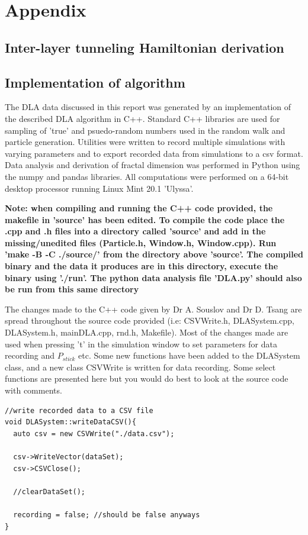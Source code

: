 \documentclass[10pt, twocolumn]{article} %
\begin{document}



\clearpage

\onecolumn

\section*{Appendix}

\subsection*{Inter-layer tunneling Hamiltonian derivation}

\subsection*{Implementation of algorithm}
  The DLA data discussed in this report was generated by an implementation of the described DLA algorithm in C++. Standard C++ libraries are used for sampling of 'true' and psuedo-random numbers used in the random walk and particle generation. Utilities were written to record multiple simulations with varying parameters and to export recorded data from simulations to a csv format. Data analysis and derivation of fractal dimension was performed in Python using the numpy and pandas libraries. All computations were performed on a 64-bit desktop processor running Linux Mint 20.1 'Ulyssa'.

  \textbf{Note: when compiling and running the C++ code provided, the makefile in 'source' has been edited. To compile the code place the .cpp and .h files into a directory called 'source' and add in the missing/unedited files (Particle.h, Window.h, Window.cpp). Run 'make -B -C ./source/' from the directory above 'source'. The compiled binary and the data it produces are in this directory, execute the binary using './run'. The python data analysis file 'DLA.py' should also be run from this same directory}

  The changes made to the C++ code given by Dr A. Souslov and Dr D. Tsang are spread throughout the source code provided (i.e: CSVWrite.h, DLASystem.cpp, DLASystem.h, mainDLA.cpp, rnd.h, Makefile). Most of the changes made are used when pressing 't' in the simulation window to set parameters for data recording and $P_{stick}$ etc. Some new functions have been added to the DLASystem class, and a new class CSVWrite is written for data recording. Some select functions are presented here but you would do best to look at the source code with comments.

\begin{lstlisting}
//write recorded data to a CSV file
void DLASystem::writeDataCSV(){
  auto csv = new CSVWrite("./data.csv");

  csv->WriteVector(dataSet);
  csv->CSVClose();

  //clearDataSet();

  recording = false; //should be false anyways
}
\end{lstlisting}
\end{document}
